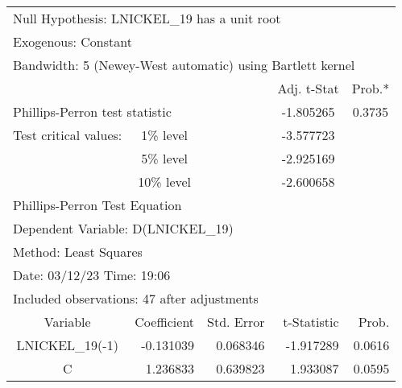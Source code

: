 \begin{tabular}{lrrrr}
\toprule
\multicolumn{4}{l}{Null Hypothesis: LNICKEL\_19 has a unit root}&\multicolumn{1}{c}{}\\
\multicolumn{2}{l}{Exogenous: Constant}&\multicolumn{1}{c}{}&\multicolumn{1}{c}{}&\multicolumn{1}{c}{}\\
\multicolumn{5}{l}{Bandwidth: 5 (Newey-West automatic) using Bartlett kernel}\\
\midrule
\multicolumn{1}{c}{}&\multicolumn{1}{c}{}&\multicolumn{1}{c}{}&\multicolumn{1}{c}{Adj. t-Stat}&\multicolumn{1}{c}{Prob.*}\\
\midrule
\multicolumn{2}{l}{Phillips-Perron test statistic}&\multicolumn{1}{l}{}&\multicolumn{1}{c}{-1.805265}&\multicolumn{1}{c}{0.3735}\\
\multicolumn{1}{l}{Test critical values:}&\multicolumn{1}{c}{1\% level}&\multicolumn{1}{c}{}&\multicolumn{1}{c}{-3.577723}&\multicolumn{1}{c}{}\\
\multicolumn{1}{c}{}&\multicolumn{1}{c}{5\% level}&\multicolumn{1}{c}{}&\multicolumn{1}{c}{-2.925169}&\multicolumn{1}{c}{}\\
\multicolumn{1}{c}{}&\multicolumn{1}{c}{10\% level}&\multicolumn{1}{c}{}&\multicolumn{1}{c}{-2.600658}&\multicolumn{1}{c}{}\\
\midrule
\multicolumn{2}{l}{Phillips-Perron Test Equation}&\multicolumn{1}{c}{}&\multicolumn{1}{c}{}&\multicolumn{1}{c}{}\\
\multicolumn{3}{l}{Dependent Variable: D(LNICKEL\_19)}&\multicolumn{1}{c}{}&\multicolumn{1}{c}{}\\
\multicolumn{2}{l}{Method: Least Squares}&\multicolumn{1}{c}{}&\multicolumn{1}{c}{}&\multicolumn{1}{c}{}\\
\multicolumn{2}{l}{Date: 03/12/23   Time: 19:06}&\multicolumn{1}{c}{}&\multicolumn{1}{c}{}&\multicolumn{1}{c}{}\\
\multicolumn{4}{l}{Included observations: 47 after adjustments}&\multicolumn{1}{c}{}\\
\midrule
\multicolumn{1}{c}{Variable}&\multicolumn{1}{r}{Coefficient}&\multicolumn{1}{r}{Std. Error}&\multicolumn{1}{r}{t-Statistic}&\multicolumn{1}{r}{Prob.}\\
\midrule
\multicolumn{1}{c}{LNICKEL\_19(-1)}&\multicolumn{1}{r}{-0.131039}&\multicolumn{1}{r}{0.068346}&\multicolumn{1}{r}{-1.917289}&\multicolumn{1}{r}{0.0616}\\
\multicolumn{1}{c}{C}&\multicolumn{1}{r}{1.236833}&\multicolumn{1}{r}{0.639823}&\multicolumn{1}{r}{1.933087}&\multicolumn{1}{r}{0.0595}\\

\end{tabular}
